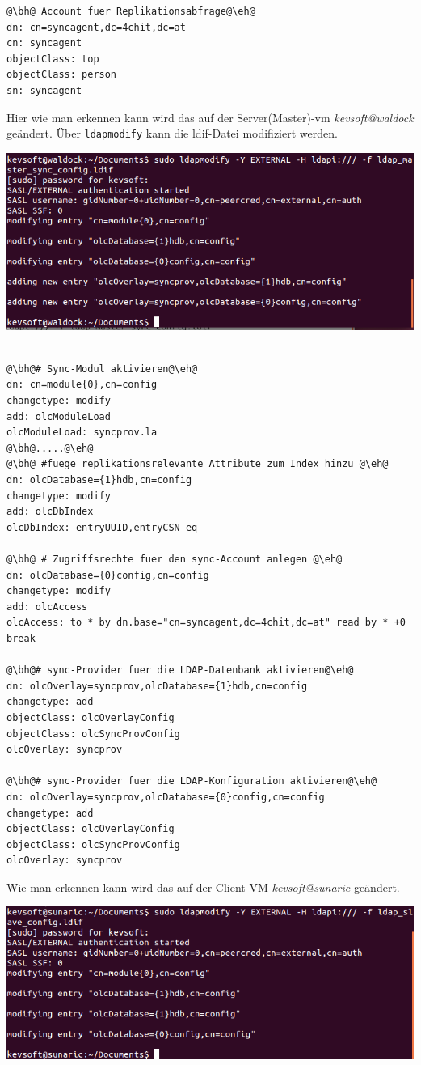 \begin{lstlisting}[escapechar=@]
@\bh@ Account fuer Replikationsabfrage@\eh@
dn: cn=syncagent,dc=4chit,dc=at
cn: syncagent
objectClass: top
objectClass: person
sn: syncagent
\end{lstlisting}
Hier wie man erkennen kann wird das auf der Server(Master)-vm \textit{kevsoft@waldock } geändert.
Über \verb|ldapmodify| kann die ldif-Datei modifiziert werden.
\begin{center}
	\includegraphics[width=1.0\linewidth]{images/a8_config_master_sync.PNG}
\end{center}

\begin{lstlisting}[escapechar=@]
      
@\bh@# Sync-Modul aktivieren@\eh@
dn: cn=module{0},cn=config
changetype: modify
add: olcModuleLoad
olcModuleLoad: syncprov.la
@\bh@.....@\eh@
@\bh@ #fuege replikationsrelevante Attribute zum Index hinzu @\eh@
dn: olcDatabase={1}hdb,cn=config
changetype: modify
add: olcDbIndex
olcDbIndex: entryUUID,entryCSN eq

@\bh@ # Zugriffsrechte fuer den sync-Account anlegen @\eh@
dn: olcDatabase={0}config,cn=config
changetype: modify
add: olcAccess
olcAccess: to * by dn.base="cn=syncagent,dc=4chit,dc=at" read by * +0 break

@\bh@# sync-Provider fuer die LDAP-Datenbank aktivieren@\eh@
dn: olcOverlay=syncprov,olcDatabase={1}hdb,cn=config
changetype: add
objectClass: olcOverlayConfig
objectClass: olcSyncProvConfig
olcOverlay: syncprov

@\bh@# sync-Provider fuer die LDAP-Konfiguration aktivieren@\eh@
dn: olcOverlay=syncprov,olcDatabase={0}config,cn=config
changetype: add
objectClass: olcOverlayConfig
objectClass: olcSyncProvConfig
olcOverlay: syncprov
\end{lstlisting}

Wie man erkennen kann wird das auf der Client-VM \textit{kevsoft@sunaric } geändert.
\begin{center}
	\includegraphics[width=1.0\linewidth]{images/a9_config_slave_sync.PNG}
\end{center}

